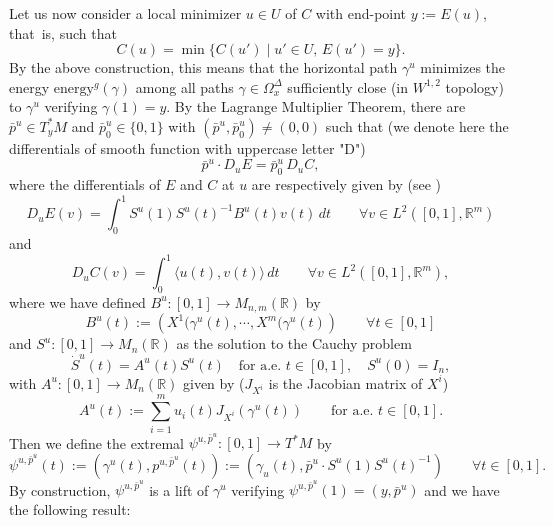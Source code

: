 \documentclass[JEP,XML,SOM,Unicode,NoFloatCountersInSection,published]{cedram}
\let\sep\mid
\newcommand\R{\mathbb R}
\theoremstyle{definition}
\begin{document}
Let us now consider a local minimizer $u\in U$ of $C$ with end-point $y:=E(u)$, that~is, such that
\[
C(u) = \min \bigl\{C(u') \sep  u' \in U, \, E(u') = y \bigr\}.
\]
By the above construction, this means that the horizontal path $\gamma^u$ minimizes the energy $\mathrm{energy}^g(\gamma)$ among all paths $\gamma\in \Omega_x^{\Delta}$ sufficiently close (in $W^{1,2}$ topology) to $\gamma^u$ verifying $\gamma(1)=y$. By the Lagrange Multiplier Theorem, there are $\bar{p}^u \in T_y^*M$ and $\bar{p}_0^u \in \{0,1\}$ with $(\bar{p}^u,\bar{p}_0^u) \neq (0,0)$ such that (we denote here the differentials of smooth function with uppercase letter "D")
\begin{equation}\label{Lagrange}
\bar{p}^u \cdot D_{u} E = \bar{p}_0^u \, D_{u} C,
\end{equation}
where the differentials of $E$ and $C$ at $u$ are respectively given by (see \eg \cite[Prop.\,1.8, p.\,14]{riffordbook})
\begin{equation}\label{dE}
D_{u}E(v) = \int_0^1 S^u(1) S^u(t)^{-1} B^u(t) v(t)\, dt \qquad \forall v \in L^2([0,1],\R^m)
\end{equation}
and
\begin{equation}\label{dC}
D_{u}C(v) = \int_0^1\langle u(t),v(t)\rangle \, dt \qquad \forall v \in L^2([0,1],\R^m),
\end{equation}
where we have defined $B^u : [0,1] \to M_{n,m}(\R)$ by
\begin{equation}\label{Bu}
B^u(t) := \left(X^{1}(\gamma^{u}(t),\cdots,X^{m}(\gamma^{u}(t) \right) \qquad \forall t \in [0,1]
\end{equation}
and $S^u:[0,1] \to M_n(\R)$ as the solution to the Cauchy problem
\begin{equation}\label{5avril3}
\dot{S}^u(t)=A^u(t)S^u(t) \quad \text{for a.e. } t \in [0,1], \quad S^u(0)=I_{n},
\end{equation}
with $A^u:[0,1] \to M_n(\R)$ given by ($J_{X^i}$ is the Jacobian matrix of $X^i$)
\begin{equation}\label{5avril4}
A^u(t) := \sum_{i=1}^m u_{i}(t) J_{X^{i}}\left(\gamma^u(t)\right) \qquad \text{for a.e. } t \in [0,1].
\end{equation}
Then we define the extremal $\psi^{u,\bar{p}^u} : [0,1] \to T^*M$ by
\begin{equation}\label{formulaextremal}
\psi^{u,\bar{p}^u}(t) := \left(\gamma^u(t),p^{u,\bar{p}^u}(t)\right) := \left(\gamma_u(t), \bar{p}^u \cdot S^u(1)S^u(t)^{-1}\right) \qquad \forall t \in [0,1].
\end{equation}
By construction, $\psi^{u,\bar{p}^u}$ is a lift of $\gamma^u$ verifying $\psi^{u,\bar{p}^u}(1)=(y,\bar{p}^u)$ and we have the following result:
\end{document}
